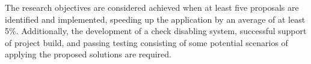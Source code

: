 The research objectives are considered achieved when at least five proposals are identified and implemented,
speeding up the application by an average of at least 5\%. Additionally, the development
of a check disabling system, successful support of project build, and passing testing
consisting of some potential scenarios of applying the proposed solutions are required.
